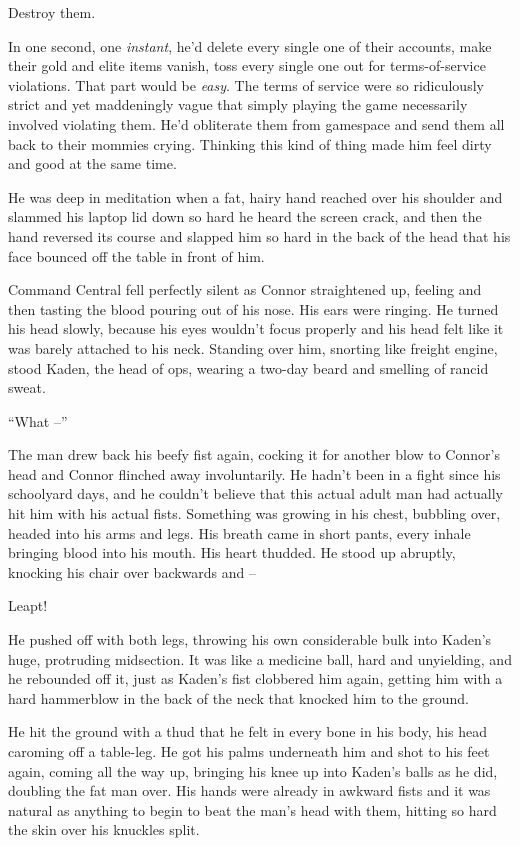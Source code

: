 Destroy them.

In one second, one \emph{instant}, he'd delete every single one of
their accounts, make their gold and elite items vanish, toss every
single one out for terms-of-service violations. That part would be
\emph{easy}. The terms of service were so ridiculously strict and
yet maddeningly vague that simply playing the game necessarily
involved violating them. He'd obliterate them from gamespace and
send them all back to their mommies crying. Thinking this kind of
thing made him feel dirty and good at the same time.

He was deep in meditation when a fat, hairy hand reached over his
shoulder and slammed his laptop lid down so hard he heard the
screen crack, and then the hand reversed its course and slapped him
so hard in the back of the head that his face bounced off the table
in front of him.

Command Central fell perfectly silent as Connor straightened up,
feeling and then tasting the blood pouring out of his nose. His
ears were ringing. He turned his head slowly, because his eyes
wouldn't focus properly and his head felt like it was barely
attached to his neck. Standing over him, snorting like freight
engine, stood Kaden, the head of ops, wearing a two-day beard and
smelling of rancid sweat.

``What --''

The man drew back his beefy fist again, cocking it for another blow
to Connor's head and Connor flinched away involuntarily. He hadn't
been in a fight since his schoolyard days, and he couldn't believe
that this actual adult man had actually hit him with his actual
fists. Something was growing in his chest, bubbling over, headed
into his arms and legs. His breath came in short pants, every
inhale bringing blood into his mouth. His heart thudded. He stood
up abruptly, knocking his chair over backwards and --

Leapt!

He pushed off with both legs, throwing his own considerable bulk
into Kaden's huge, protruding midsection. It was like a medicine
ball, hard and unyielding, and he rebounded off it, just as Kaden's
fist clobbered him again, getting him with a hard hammerblow in the
back of the neck that knocked him to the ground.

He hit the ground with a thud that he felt in every bone in his
body, his head caroming off a table-leg. He got his palms
underneath him and shot to his feet again, coming all the way up,
bringing his knee up into Kaden's balls as he did, doubling the fat
man over. His hands were already in awkward fists and it was
natural as anything to begin to beat the man's head with them,
hitting so hard the skin over his knuckles split.

